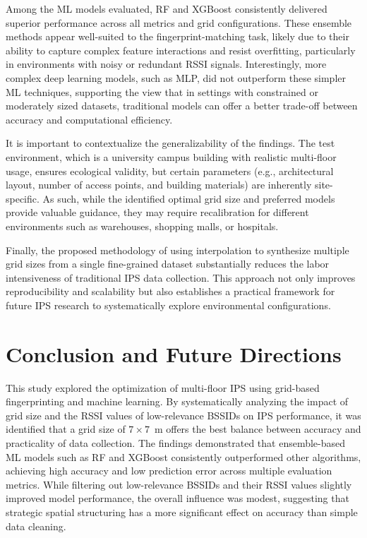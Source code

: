 \documentclass[runningheads]{llncs}
\begin{document}
Among the ML models evaluated, RF and XGBoost consistently delivered superior performance across all metrics and grid configurations. These ensemble methods appear well-suited to the fingerprint-matching task, likely due to their ability to capture complex feature interactions and resist overfitting, particularly in environments with noisy or redundant RSSI signals. Interestingly, more complex deep learning models, such as MLP, did not outperform these simpler ML techniques, supporting the view that in settings with constrained or moderately sized datasets, traditional models can offer a better trade-off between accuracy and computational efficiency.

It is important to contextualize the generalizability of the findings. The test environment, which is a university campus building with realistic multi-floor usage, ensures ecological validity, but certain parameters (e.g., architectural layout, number of access points, and building materials) are inherently site-specific. As such, while the identified optimal grid size and preferred models provide valuable guidance, they may require recalibration for different environments such as warehouses, shopping malls, or hospitals.

Finally, the proposed methodology of using interpolation to synthesize multiple grid sizes from a single fine-grained dataset substantially reduces the labor intensiveness of traditional IPS data collection. This approach not only improves reproducibility and scalability but also establishes a practical framework for future IPS research to systematically explore environmental configurations.

\section{Conclusion and Future Directions}\label{sec:conclusion}

This study explored the optimization of multi-floor IPS using grid-based fingerprinting and machine learning. By systematically analyzing the impact of grid size and the RSSI values of low-relevance BSSIDs on IPS performance, it was identified that a grid size of $7\times7$~m offers the best balance between accuracy and practicality of data collection. The findings demonstrated that ensemble-based ML models such as RF and XGBoost consistently outperformed other algorithms, achieving high accuracy and low prediction error across multiple evaluation metrics. While filtering out low-relevance BSSIDs and their RSSI values slightly improved model performance, the overall influence was modest, suggesting that strategic spatial structuring has a more significant effect on accuracy than simple data cleaning.
\end{document}
